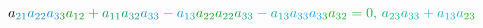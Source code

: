 \documentclass[12pt]{article}
\begin{document}
\begin{displaymath}
{a} _ { \mathcolor[RGB]{15,135,165}{2} \mathcolor[RGB]{15,135,180}{1} } \mathcolor[RGB]{15,135,195}{a} _ { \mathcolor[RGB]{15,135,210}{2} \mathcolor[RGB]{15,135,225}{2} } \mathcolor[RGB]{15,135,240}{a} _ { \mathcolor[RGB]{15,135,255}{3} \mathcolor[RGB]{15,150,0}{3} } \mathcolor[RGB]{15,150,15}{a} _ { \mathcolor[RGB]{15,150,30}{1} \mathcolor[RGB]{15,150,45}{2} } \mathcolor[RGB]{15,150,60}{+} \mathcolor[RGB]{15,150,75}{a} _ { \mathcolor[RGB]{15,150,90}{1} \mathcolor[RGB]{15,150,105}{1} } \mathcolor[RGB]{15,150,120}{a} _ { \mathcolor[RGB]{15,150,135}{3} \mathcolor[RGB]{15,150,150}{2} } \mathcolor[RGB]{15,150,165}{a} _ { \mathcolor[RGB]{15,150,180}{3} \mathcolor[RGB]{15,150,195}{3} } \mathcolor[RGB]{15,150,210}{-} \mathcolor[RGB]{15,150,225}{a} _ { \mathcolor[RGB]{15,150,240}{1} \mathcolor[RGB]{15,150,255}{3} } \mathcolor[RGB]{15,165,0}{a} _ { \mathcolor[RGB]{15,165,15}{2} \mathcolor[RGB]{15,165,30}{2} } \mathcolor[RGB]{15,165,45}{a} _ { \mathcolor[RGB]{15,165,60}{2} \mathcolor[RGB]{15,165,75}{2} } \mathcolor[RGB]{15,165,90}{a} _ { \mathcolor[RGB]{15,165,105}{3} \mathcolor[RGB]{15,165,120}{3} } \mathcolor[RGB]{15,165,135}{-} \mathcolor[RGB]{15,165,150}{a} _ { \mathcolor[RGB]{15,165,165}{1} \mathcolor[RGB]{15,165,180}{3} } \mathcolor[RGB]{15,165,195}{a} _ { \mathcolor[RGB]{15,165,210}{3} \mathcolor[RGB]{15,165,225}{3} } \mathcolor[RGB]{15,165,240}{a} _ { \mathcolor[RGB]{15,165,255}{3} \mathcolor[RGB]{15,180,0}{3} } \mathcolor[RGB]{15,180,15}{a} _ { \mathcolor[RGB]{15,180,30}{3} \mathcolor[RGB]{15,180,45}{2} } \mathcolor[RGB]{15,180,60}{=} \mathcolor[RGB]{15,180,75}{0} \mathcolor[RGB]{15,180,90}{,} \mathcolor[RGB]{15,180,105}{\,

a} _ { \mathcolor[RGB]{15,180,120}{2} \mathcolor[RGB]{15,180,135}{3} } \mathcolor[RGB]{15,180,150}{a} _ { \mathcolor[RGB]{15,180,165}{3} \mathcolor[RGB]{15,180,180}{3} } \mathcolor[RGB]{15,180,195}{+} \mathcolor[RGB]{15,180,210}{a} _ { \mathcolor[RGB]{15,180,225}{1} \mathcolor[RGB]{15,180,240}{3} } \mathcolor[RGB]{15,180,255}{a} _ { \mathcolor[RGB]{15,195,0}{2} \mathcolor[RGB]{15,195,15}{3} }
\end{displaymath}
\end{document}
